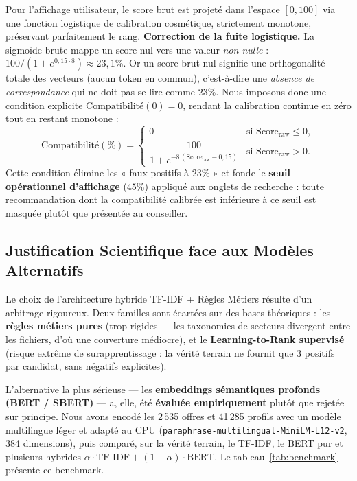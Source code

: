 \documentclass[11pt,a4paper]{article}
\newcommand{\raw}{\text{Score}_{\text{raw}}}
\begin{document}
Pour l'affichage utilisateur, le score brut est projeté dans l'espace $[0, 100]$ via une
fonction logistique de calibration cosmétique, strictement monotone, préservant parfaitement le
rang. \textbf{Correction de la fuite logistique.} La sigmoïde brute mappe un score nul vers une
valeur \emph{non nulle} : $100 / (1 + e^{0{,}15 \cdot 8}) \approx 23{,}1\%$. Or un score brut nul
signifie une orthogonalité totale des vecteurs (aucun token en commun), c'est-à-dire une
\emph{absence de correspondance} qui ne doit pas se lire comme $23\%$. Nous imposons donc une
condition explicite $\mathrm{Compatibilité}(0) = 0$, rendant la calibration continue en zéro tout
en restant monotone :
\begin{equation}
\mathrm{Compatibilité}(\%) =
\begin{cases}
0 & \text{si } \raw \leq 0, \\[6pt]
\dfrac{100}{1 + e^{-8\,(\raw - 0{,}15)}} & \text{si } \raw > 0.
\end{cases}
\label{eq:calib}
\end{equation}
Cette condition élimine les « faux positifs à $23\%$ » et fonde le \textbf{seuil opérationnel
d'affichage} ($45\%$) appliqué aux onglets de recherche : toute recommandation dont la
compatibilité calibrée est inférieure à ce seuil est masquée plutôt que présentée au conseiller.

\subsection{Justification Scientifique face aux Modèles Alternatifs}
\label{sec:benchmark}
Le choix de l'architecture hybride TF-IDF + Règles Métiers résulte d'un arbitrage rigoureux.
Deux familles sont écartées sur des bases théoriques : les \textbf{règles métiers pures} (trop
rigides — les taxonomies de secteurs divergent entre les fichiers, d'où une couverture médiocre),
et le \textbf{Learning-to-Rank supervisé} (risque extrême de surapprentissage : la vérité terrain
ne fournit que 3 positifs par candidat, sans négatifs explicites).

L'alternative la plus sérieuse — les \textbf{embeddings sémantiques profonds (BERT / SBERT)} — a,
elle, été \textbf{évaluée empiriquement} plutôt que rejetée sur principe. Nous avons encodé les
2\,535 offres et 41\,285 profils avec un modèle multilingue léger et adapté au CPU
(\texttt{paraphrase-multilingual-MiniLM-L12-v2}, 384 dimensions), puis comparé, sur la vérité
terrain, le TF-IDF, le BERT pur et plusieurs hybrides $\alpha \cdot \text{TF-IDF} +
(1-\alpha)\cdot\text{BERT}$. Le tableau~\ref{tab:benchmark} présente ce benchmark.
\end{document}
